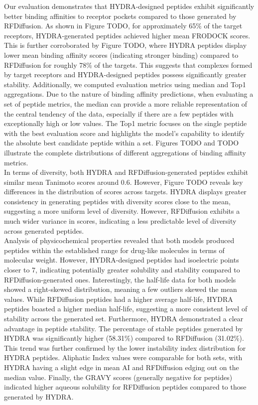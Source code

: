 Our evaluation demonstrates that HYDRA-designed peptides exhibit significantly better binding affinities to receptor pockets compared to those generated by RFDiffusion. As shown in Figure TODO, for approximately 65\% of the target receptors, HYDRA-generated peptides achieved higher mean FRODOCK scores. This is further corroborated by Figure TODO, where HYDRA peptides display lower mean binding affinity scores (indicating stronger binding) compared to RFDiffusion for roughly 78\% of the targets. This suggests that complexes formed by target receptors and HYDRA-designed peptides possess significantly greater stability. 
Additionally, we computed evaluation metrics using median and Top1 aggregations. Due to the nature of binding affinity predictions, when evaluating a set of peptide metrics, the median can provide a more reliable representation of the central tendency of the data, especially if there are a few peptides with exceptionally high or low values. The Top1 metric focuses on the single peptide with the best evaluation score and highlights the model's capability to identify the absolute best candidate peptide within a set. Figures TODO and TODO illustrate the complete distributions of different aggregations of binding affinity metrics. \\

In terms of diversity, both HYDRA and RFDiffusion-generated peptides exhibit similar mean Tanimoto scores around 0.6. However, Figure TODO reveals key differences in the distribution of scores across targets. HYDRA displays greater consistency in generating peptides with diversity scores close to the mean, suggesting a more uniform level of diversity. However, RFDiffusion exhibits a much wider variance in scores, indicating a less predictable level of diversity across generated peptides. \\

Analysis of physicochemical properties revealed that both models produced peptides within the established range for drug-like molecules in terms of molecular weight. However, HYDRA-designed peptides had isoelectric points closer to 7, indicating potentially greater solubility and stability compared to RFDiffusion-generated ones. Interestingly, the half-life data for both models showed a right-skewed distribution, meaning a few outliers skewed the mean values. While RFDiffusion peptides had a higher average half-life, HYDRA peptides boasted a higher median half-life, suggesting a more consistent level of stability across the generated set. Furthermore, HYDRA demonstrated a clear advantage in peptide stability. The percentage of stable peptides generated by HYDRA was significantly higher (58.31\%) compared to RFDiffusion (31.02\%). This trend was further confirmed by the lower instability index distribution for HYDRA peptides. Aliphatic Index values were comparable for both sets, with HYDRA having a slight edge in mean AI and RFDiffusion edging out on the median value. Finally, the GRAVY scores (generally negative for peptides) indicated higher aqueous solubility for RFDiffusion peptides compared to those generated by HYDRA. \\

